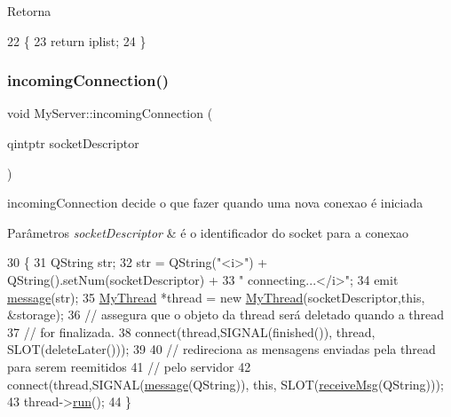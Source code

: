 \begin{DoxyReturn}{Retorna}

\end{DoxyReturn}

\begin{DoxyCode}
22                                \{
23   \textcolor{keywordflow}{return} iplist;
24 \}
\end{DoxyCode}
\mbox{\label{class_my_server_a635c7a1e6817285ffb1a2a3842df010b}} 
\subsubsection{\texorpdfstring{incoming\+Connection()}{incomingConnection()}}
{\footnotesize\ttfamily void My\+Server\+::incoming\+Connection (\begin{DoxyParamCaption}\item[{qintptr}]{socket\+Descriptor }\end{DoxyParamCaption})\hspace{0.3cm}{\ttfamily [protected]}}



incoming\+Connection decide o que fazer quando uma nova conexao é iniciada 


\begin{DoxyParams}{Parâmetros}
{\em socket\+Descriptor} & é o identificador do socket para a conexao \\
\hline
\end{DoxyParams}

\begin{DoxyCode}
30                                                          \{
31   QString str;
32   str = QString(\textcolor{stringliteral}{"<i>"}) + QString().setNum(socketDescriptor) +
33       \textcolor{stringliteral}{" connecting...</i>"};
34   emit \mbox{\hyperlink{class_my_server_a2b884bce37840b1b461363a37b463b30}{message}}(str);
35   \mbox{\hyperlink{class_my_thread}{MyThread}} *thread = \textcolor{keyword}{new} \mbox{\hyperlink{class_my_thread}{MyThread}}(socketDescriptor,\textcolor{keyword}{this}, &storage);
36   \textcolor{comment}{// assegura que o objeto da thread será deletado quando a thread}
37   \textcolor{comment}{// for finalizada.}
38   connect(thread,SIGNAL(finished()), thread, SLOT(deleteLater()));
39 
40   \textcolor{comment}{// redireciona as mensagens enviadas pela thread para serem reemitidos}
41   \textcolor{comment}{// pelo servidor}
42   connect(thread,SIGNAL(\mbox{\hyperlink{class_my_server_a2b884bce37840b1b461363a37b463b30}{message}}(QString)), \textcolor{keyword}{this}, SLOT(\mbox{\hyperlink{class_my_server_ac795ee6f1607c0fa4e635a0da2bf2164}{receiveMsg}}(QString)));
43   thread->\mbox{\hyperlink{class_my_thread_a48f2e366e852087c53705f64e1ee65c2}{run}}();
44 \}
\end{DoxyCode}
\mbox{\label{class_my_server_a2b884bce37840b1b461363a37b463b30}} 
